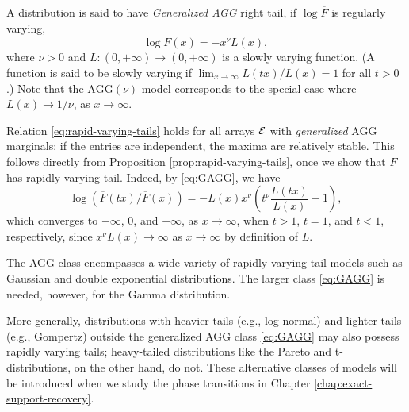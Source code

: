 \begin{example} \label{exmp:AGG}
A distribution is said to have \emph{Generalized AGG} right tail, if $\log{\overline{F}}$ is regularly varying,
\begin{equation} \label{eq:GAGG}
    \log{\overline{F}(x)} = - x^\nu L(x),
\end{equation}
where $\nu>0$ and $L: (0,+\infty)\to(0,+\infty)$ is a slowly varying function. (A function is said to be slowly varying if $\lim_{x\to\infty}L(tx)/L(x) = 1$ for all $t>0$.) Note that the $\text{AGG}(\nu)$ model corresponds to the special case where $L(x)\to 1/\nu$, as $x\to\infty$.

Relation \eqref{eq:rapid-varying-tails} holds for all arrays $\cal E$ with \emph{generalized} AGG marginals; if the entries are independent, the maxima are relatively stable. 
This follows directly from Proposition \ref{prop:rapid-varying-tails}, once we show that $F$ has rapidly varying tail. 
Indeed, by \eqref{eq:GAGG}, we have
$$
\log{\left(\overline{F}(tx)\Big/ \overline{F}(x)\right)} = - L(x)x^\nu\left(t^\nu\frac{L(tx)}{L(x)} - 1\right),
$$
which converges to $-\infty$, 0, and $+\infty$, as $x\to\infty$, when $t>1$, $t=1$, and $t<1$, respectively, since $x^\nu L(x)\to\infty$ as $x\to\infty$ by definition of $L$.
\end{example}


The \ac{AGG} class encompasses a wide variety of rapidly varying tail models such as Gaussian and double exponential distributions. The larger class \eqref{eq:GAGG} is needed, however, for the Gamma distribution.

More generally, distributions with heavier tails (e.g., log-normal) and lighter tails (e.g., Gompertz) outside the generalized AGG class \eqref{eq:GAGG} may also possess rapidly varying tails;
heavy-tailed distributions like the Pareto and t-distributions, on the other hand, do not.
{ 
These alternative classes of models will be introduced when we study the phase transitions in 
Chapter \ref{chap:exact-support-recovery}.}


